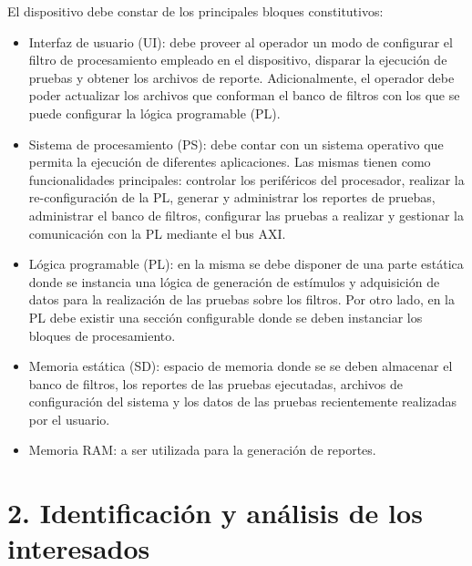 \documentclass[
11pt, %
]{charter}
\begin{document}
El dispositivo debe constar de los principales bloques constitutivos:
\begin{itemize}
	\item Interfaz de usuario (UI): debe proveer al operador un modo de configurar el filtro de procesamiento empleado en el dispositivo, disparar la ejecución de pruebas y obtener los archivos de reporte. Adicionalmente, el operador debe poder actualizar los archivos que conforman el banco de filtros con los que se puede configurar la lógica programable (PL).
	\item Sistema de procesamiento (PS): debe contar con un sistema operativo que permita la ejecución de diferentes aplicaciones. Las mismas tienen como funcionalidades principales: controlar los periféricos del procesador, realizar la re-configuración de la PL, generar y administrar los reportes de pruebas, administrar el banco de filtros, configurar las pruebas a realizar y gestionar la comunicación con la PL mediante el bus AXI.
	\item Lógica programable (PL): en la misma se debe disponer de una parte estática donde se instancia una lógica de generación de estímulos y adquisición de datos para la realización de las pruebas sobre los filtros. Por otro lado, en la PL debe existir una sección configurable donde se deben instanciar los bloques de procesamiento.
	\item Memoria estática (SD): espacio de memoria donde se se deben almacenar el banco de filtros, los reportes de las pruebas ejecutadas, archivos de configuración del sistema y los datos de las pruebas recientemente realizadas por el usuario.
	\item Memoria RAM: a ser utilizada para la generación de reportes.
\end{itemize}
 
\clearpage

\section{2. Identificación y análisis de los interesados}
\label{sec:interesados}
\end{document}
